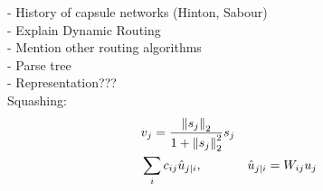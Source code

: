 - History of capsule networks (Hinton, Sabour) \\
- Explain Dynamic Routing \\
- Mention other routing algorithms \\
- Parse tree \\
- Representation??? \\

Squashing:
\begin{equation}
\begin{aligned}
& v_j = \frac{\left \lVert s_j \right \rVert _2}{1 + \left \lVert s_j \right \rVert _2^2} s_j \\
& \sum_{i} c_{ij} \hat{u}_{j \vert i}, & & \hat{u}_{j \vert i} = W_{ij}u_j
\end{aligned}
\end{equation}